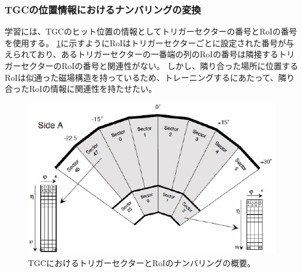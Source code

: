 
\subsubsection{TGCの位置情報におけるナンバリングの変換}
学習には、TGCのヒット位置の情報としてトリガーセクターの番号とRoIの番号を使用する。
\ref{fig:TGCnumbering}に示すようにRoIはトリガーセクターごとに設定された番号が与えられており、あるトリガーセクターの一番端の列のRoIの番号は隣接するトリガーセクターのRoIの番号と関連性がない。
しかし、隣り合った場所に位置するRoIは似通った磁場構造を持っているため、トレーニングするにあたって、隣り合ったRoIの情報に関連性を持たせたい。

\begin{figure}[tb]
  \centering
  \includegraphics[clip, width=12cm]{fig/4/TGC_numbering.pdf}
  \caption{TGCにおけるトリガーセクターとRoIのナンバリングの概要。}
  \label{fig:TGCnumbering}
\end{figure}

